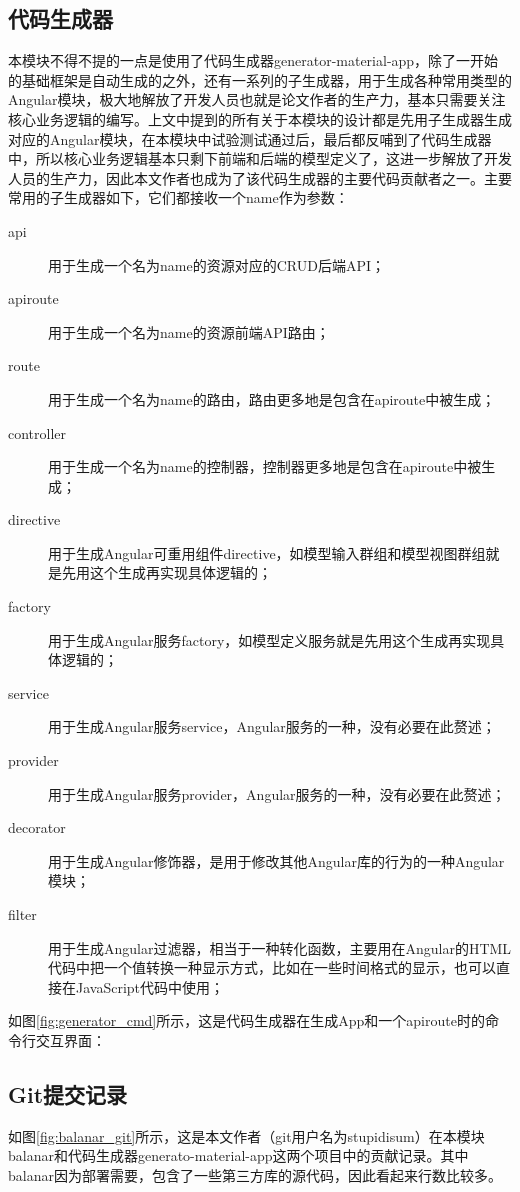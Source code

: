 \subsection{代码生成器}
本模块不得不提的一点是使用了代码生成器generator-material-app，除了一开始的基础框架是自动生成的之外，还有一系列的子生成器，用于生成各种常用类型的Angular模块，极大地解放了开发人员也就是论文作者的生产力，基本只需要关注核心业务逻辑的编写。上文中提到的所有关于本模块的设计都是先用子生成器生成对应的Angular模块，在本模块中试验测试通过后，最后都反哺到了代码生成器中，所以核心业务逻辑基本只剩下前端和后端的模型定义了，这进一步解放了开发人员的生产力，因此本文作者也成为了该代码生成器的主要代码贡献者之一。主要常用的子生成器如下，它们都接收一个name作为参数：
\begin{description}
  \item[api] 用于生成一个名为name的资源对应的CRUD后端API；
  \item[apiroute] 用于生成一个名为name的资源前端API路由；
  \item[route] 用于生成一个名为name的路由，路由更多地是包含在apiroute中被生成；
  \item[controller] 用于生成一个名为name的控制器，控制器更多地是包含在apiroute中被生成；
  \item[directive] 用于生成Angular可重用组件directive，如模型输入群组和模型视图群组就是先用这个生成再实现具体逻辑的；
  \item[factory] 用于生成Angular服务factory，如模型定义服务就是先用这个生成再实现具体逻辑的；
  \item[service] 用于生成Angular服务service，Angular服务的一种，没有必要在此赘述；
  \item[provider] 用于生成Angular服务provider，Angular服务的一种，没有必要在此赘述；
  \item[decorator] 用于生成Angular修饰器，是用于修改其他Angular库的行为的一种Angular模块；
  \item[filter] 用于生成Angular过滤器，相当于一种转化函数，主要用在Angular的HTML代码中把一个值转换一种显示方式，比如在一些时间格式的显示，也可以直接在JavaScript代码中使用；
\end{description}

如图\ref{fig:generator_cmd}所示，这是代码生成器在生成App和一个apiroute时的命令行交互界面：
\subsection{Git提交记录}
如图\ref{fig:balanar_git}所示，这是本文作者（git用户名为stupidisum）在本模块balanar和代码生成器generato-material-app这两个项目中的贡献记录。其中balanar因为部署需要，包含了一些第三方库的源代码，因此看起来行数比较多。


